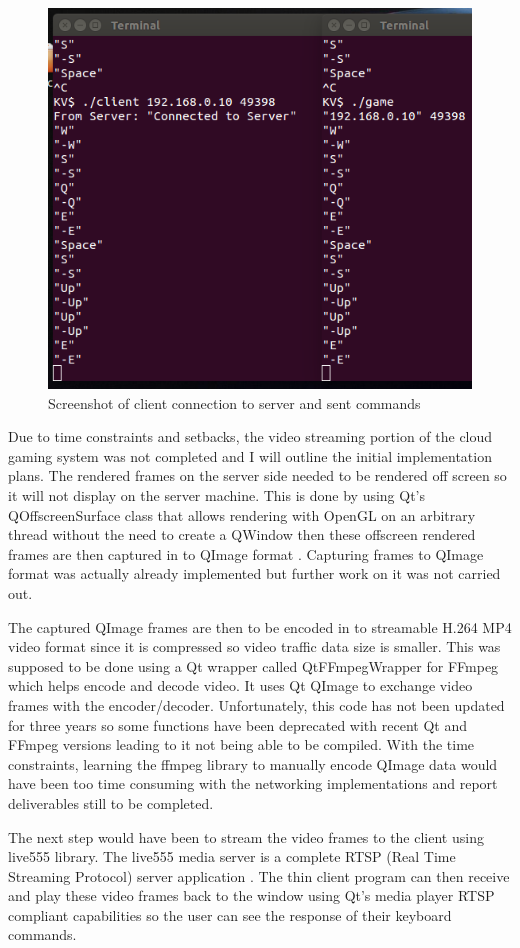 \begin{figure}[h!]
 \centering
 \includegraphics[width=0.7\linewidth]{images/gamecommands.png}
 \caption{Screenshot of client connection to server and sent commands}
 \label{fig:gamecommands}
\end{figure}

Due to time constraints and setbacks, the video streaming portion of the cloud gaming system was not completed and I will outline the initial implementation plans. The rendered frames on the server side needed to be rendered off screen so it will not display on the server machine. This is done by using Qt's QOffscreenSurface class that allows rendering with OpenGL on an arbitrary thread without the need to create a QWindow then these offscreen rendered frames are then captured in to QImage format \cite{qoffscreen}. Capturing frames to QImage format was actually already implemented but further work on it was not carried out.
\newline
\par
The captured QImage frames are then to be encoded in to streamable H.264 MP4 video format since it is compressed so video traffic data size is smaller. This was supposed to be done using a Qt wrapper called QtFFmpegWrapper\cite{qtffmpeg} for FFmpeg which helps encode and decode video. It uses Qt QImage to exchange video frames with the encoder/decoder. Unfortunately, this code has not been updated for three years so some functions have been deprecated with recent Qt and FFmpeg versions leading to it not being able to be compiled. With the time constraints, learning the ffmpeg library to manually encode QImage data would have been too time consuming with the networking implementations and report deliverables still to be completed.
\newline
\par
The next step would have been to stream the video frames to the client using live555 library. The live555 media server is a complete RTSP (Real Time Streaming Protocol) server application \cite{live555}. The thin client program can then receive and play these video frames back to the window using Qt's media player RTSP compliant capabilities so the user can see the response of their keyboard commands.
 
